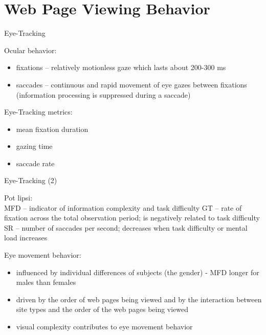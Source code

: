 \section{Web Page Viewing Behavior}


\begin{frame}{Eye-Tracking}

Ocular behavior:
\begin{itemize}
	\item fixations – relatively motionless gaze which lasts about 200-300 ms
	\item saccades – continuous and rapid movement of eye gazes between fixations (information processing is suppressed during a saccade) \newline
\end{itemize}

Eye-Tracking metrics:
\begin{itemize}
	\item mean fixation duration
	\item gazing time
	\item saccade rate \newline
\end{itemize}

\end{frame}


\begin{frame}{Eye-Tracking (2)}

{\color{red} Pot lipsi:\\
MFD – indicator of information complexity and task difficulty \newline
GT – rate of fixation across the total observation period; is negatively related to task difficulty \newline
SR – number of saccades per second; decreases when task difficulty or mental load increases \newline
}

Eye movement behavior:
\begin{itemize}
	\item influenced by individual differences of subjects (the gender) \newline
		- MFD longer for males than females
	\item driven by the order of web pages being viewed and by the interaction between site types and the order of the web pages being viewed
	\item visual complexity contributes to eye movement behavior
\end{itemize}

\end{frame}


